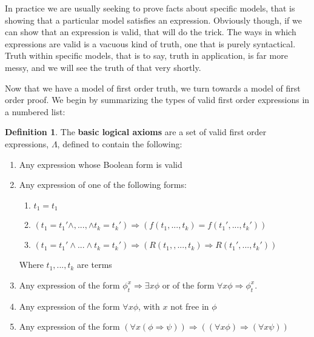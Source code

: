 \documentclass{article}
\theoremstyle{definition}
\newtheorem{definition}{Definition}[section]
\theoremstyle{plain}
\theoremstyle{theorem}
\begin{document}
\par In practice we are usually seeking to prove facts about specific models, that is showing that a particular model satisfies an expression. Obviously though, if we can show that an expression is valid, that will do the trick. The ways in which expressions are valid is a vacuous kind of truth, one that is purely syntactical. Truth within specific models, that is to say, truth in application, is far more messy, and we will see the truth of that very shortly.
\par Now that we have a model of first order truth, we turn towards a model of first order proof. We begin by summarizing the types of valid first order expressions in a numbered list:
\begin{definition}
    The \textbf{basic logical axioms} are a set of valid first order expressions, $\Lambda$, defined to contain the following:
    \begin{enumerate}
        \item Any expression whose Boolean form is valid
        \item Any expression of one of the following forms:
            \begin{enumerate}
                \item $t_1 = t_1$
                \item $(t_1 = t_1' \wedge,...,\wedge t_k = t_k') \Rightarrow (f(t_1,...,t_k) = f(t_1',...,t_k'))$
                \item $(t_1 = t_1' \wedge ... \wedge t_k = t_k') \Rightarrow (R(t_1,,...,t_k) \Rightarrow R(t_1',...,t_k'))$
            \end{enumerate}
            Where $t_1,...,t_k$ are terms
        \item Any expression of the form $\phi_t^x \Rightarrow \exists x \phi$ or of the form $\forall x \phi \Rightarrow \phi_t^x$.
        \item Any expression of the form $\forall x \phi$, with $x$ not free in $\phi$
        \item Any expression of the form $(\forall x (\phi \Rightarrow \psi)) \Rightarrow ((\forall x \phi) \Rightarrow (\forall x \psi))$
    \end{enumerate}
\end{definition}
\end{document}
